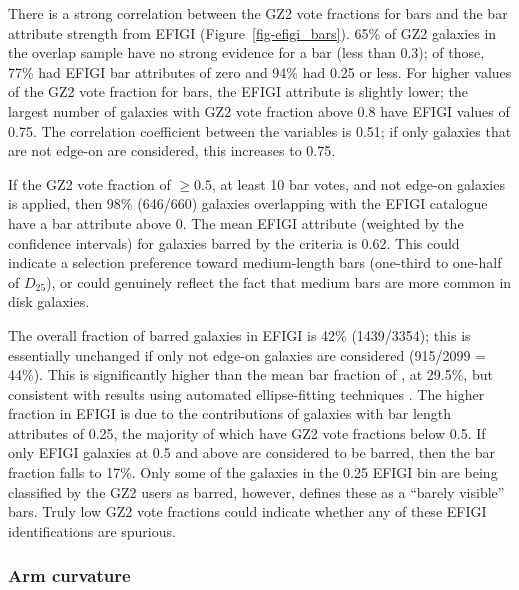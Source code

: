 \documentclass[useAMS,usenatbib]{mn2e}
\begin{document}
There is a strong correlation between the GZ2 vote fractions for bars and the bar attribute strength from EFIGI (Figure~\ref{fig-efigi_bars}). 65\% of GZ2 galaxies in the overlap sample have no strong evidence for a bar (less than 0.3); of those, 77\% had EFIGI bar attributes of zero and 94\% had 0.25 or less. For higher values of the GZ2 vote fraction for bars, the EFIGI attribute is slightly lower; the largest number of galaxies with GZ2 vote fraction above 0.8 have EFIGI values of 0.75. The correlation coefficient between the variables is 0.51; if only galaxies that are not edge-on are considered, this increases to 0.75. 

If the \citet{mas11c} GZ2 vote fraction of $\geq0.5$, at least 10 bar votes, and not edge-on galaxies is applied, then 98\% (646/660) galaxies overlapping with the EFIGI catalogue have a bar attribute above 0. The mean EFIGI attribute (weighted by the confidence intervals) for galaxies barred by the \citet{mas11c} criteria is 0.62. This could indicate a selection preference toward medium-length bars (one-third to one-half of $D_{25}$), or could genuinely reflect the fact that medium bars are more common in disk galaxies. 

The overall fraction of barred galaxies in EFIGI is 42\% (1439/3354); this is essentially unchanged if only not edge-on galaxies are considered (915/2099 = 44\%). This is significantly higher than the mean bar fraction of \citet{mas11c}, at 29.5\%, but consistent with results using automated ellipse-fitting techniques \citep{bar08,agu09}. The higher fraction in EFIGI is due to the contributions of galaxies with bar length attributes of 0.25, the majority of which have GZ2 vote fractions below 0.5. If only EFIGI galaxies at 0.5 and above are considered to be barred, then the bar fraction falls to 17\%. Only some of the galaxies in the 0.25 EFIGI bin are being classified by the GZ2 users as barred, however, \citet{bai11} defines these as a ``barely visible'' bars. Truly low GZ2 vote fractions could indicate whether any of these EFIGI identifications are spurious.


\subsubsection{Arm curvature}
\end{document}
